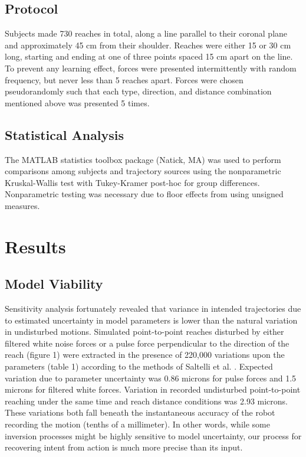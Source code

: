 \documentclass[10pt]{article}
\begin{document}
\subsection*{Protocol}
Subjects made 730 reaches in total, along a line parallel to their coronal plane and approximately 45 cm from their shoulder. Reaches were either 15 or 30 cm long, starting and ending at one of three points spaced 15 cm apart on the line. To prevent any learning effect, forces were presented intermittently with random frequency, but never less than 5 reaches apart. Forces were chosen pseudorandomly such that each type, direction, and distance combination mentioned above was presented 5 times.  

\subsection*{Statistical Analysis}
The MATLAB statistics toolbox package (Natick, MA) was used to perform comparisons among subjects and trajectory sources using the nonparametric Kruskal-Wallis test with Tukey-Kramer post-hoc for group differences. Nonparametric testing was necessary due to floor effects from using unsigned measures.


\section*{Results}

\subsection*{Model Viability}
Sensitivity analysis fortunately revealed that variance in intended trajectories due to estimated uncertainty in model parameters is lower than the natural variation in undisturbed motions.  Simulated point-to-point reaches disturbed by either filtered white noise forces or a pulse force perpendicular to the direction of the reach (figure 1) were extracted in the presence of 220,000 variations upon the parameters (table 1) according to the methods of Saltelli et al. \cite{saltelli2010variance}. Expected variation due to parameter uncertainty was 0.86 microns for pulse forces and 1.5 microns for filtered white forces. Variation in recorded undisturbed point-to-point reaching under the same time and reach distance conditions was 2.93 microns. These variations both fall beneath the instantaneous accuracy of the robot recording the motion (tenths of a millimeter). In other words, while some inversion processes might be highly sensitive to model uncertainty, our process for recovering intent from action is much more precise than its input.
\end{document}
